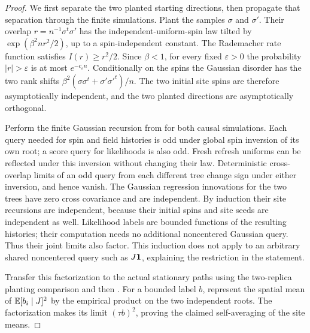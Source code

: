 \begin{proof}
We first separate the two planted starting directions, then propagate
that separation through the finite simulations.  Plant the samples
$\sigma$ and $\sigma'$.  Their overlap $r=n^{-1}\sigma^t\sigma'$
has the independent-uniform-spin law tilted by
$\exp(\beta^2nr^2/2)$, up to a spin-independent constant.  The
Rademacher rate function satisfies $I(r)\ge r^2/2$.
Since $\beta<1$, for every fixed $\varepsilon>0$ the probability
$|r|>\varepsilon$ is at most $e^{-c_\varepsilon n}$.
Conditionally on the spins the Gaussian disorder has the two rank
shifts
$\beta^2(\sigma\sigma^t+\sigma'\sigma'^t)/n$.
The two initial site spins are therefore asymptotically independent,
and the two planted directions are asymptotically orthogonal.

Perform the finite Gaussian recursion from
 for both causal simulations.  Each query
needed for spin and field histories is odd under global spin inversion
of its own root; a score query for likelihoods is also odd.  Fresh
refresh uniforms can be reflected under this inversion without changing
their law.  Deterministic cross-overlap limits of an odd query from
each different tree change sign under either inversion, and hence
vanish.  The Gaussian regression innovations for the two trees have
zero cross covariance and are independent.  By induction their
site recursions are independent, because their initial spins and site
seeds are independent as well.  Likelihood labels are bounded
functions of the resulting histories; their computation needs no
additional noncentered Gaussian query.  Thus their joint limits also
factor.  This induction does not apply to an arbitrary shared
noncentered query such as $J\mathbf 1$, explaining the restriction in the
statement.

Transfer this factorization to the actual stationary paths using the
two-replica planting comparison and then
.  For
a bounded label $b$, represent the spatial mean of
$\mathbb E[b_i\mid J]^2$ by the empirical product on the two independent
roots.  The factorization makes its limit $(\tau b)^2$, proving
the claimed self-averaging of the site means.
\end{proof}

